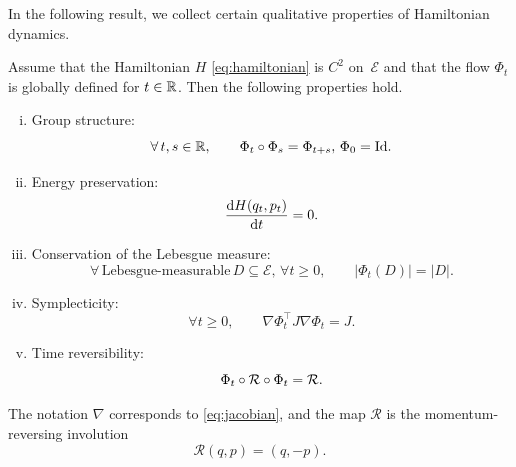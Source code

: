     In the following result, we collect certain qualitative properties of Hamiltonian dynamics.
    \begin{prop}
        \label{prop:hamiltonian_properties}
        Assume that the Hamiltonian $H$ \eqref{eq:hamiltonian} is $C^2$ on~$\mathcal E$ and that the flow $\Phi_t$ is globally defined for $t\in\mathbb{R}$. Then the following properties hold.
        \begin{enumerate}[i)]
            \item Group structure: \[\forall\, t,s\in \mathbb{R},\qquad \Phi_t \circ \Phi_s = \Phi_{t+s},\, \Phi_0=\mathrm{Id}.\]
            \item Energy preservation: \[\frac{\mathrm{d}H(q_t,p_t)}{\mathrm{d}t}=0.\]
            \item Conservation of the Lebesgue measure: \[\forall \,\text{Lebesgue-measurable}\,D\subseteq \mathcal{E},\,\forall t\geq 0,\qquad|\Phi_t(D)|=|D|.\]
            \item Symplecticity: \[\forall t\geq 0,\qquad\nabla \Phi_t^\intercal J \nabla \Phi_t = J.\]
            \item Time reversibility: \[\Phi_t \circ \mathcal{R} \circ \Phi_t=\mathcal R.\]
        \end{enumerate}
        The notation $\nabla$ corresponds to \eqref{eq:jacobian}, and the map $\mathcal R$ is the momentum-reversing involution
        \[\mathcal R(q,p)=(q,-p).\]
    \end{prop}

